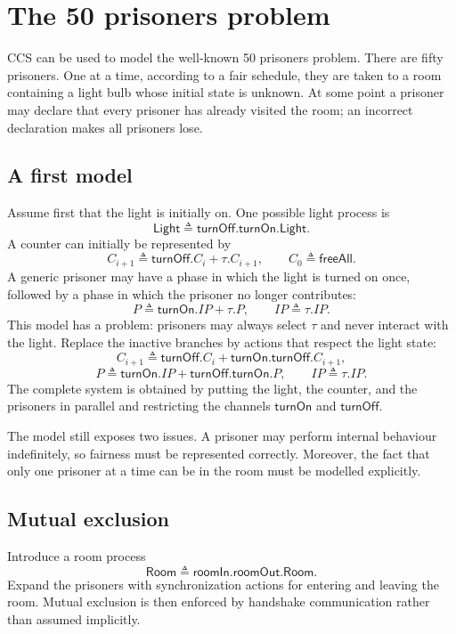 \documentclass[a4paper]{article}
\begin{document}
\section{The 50 prisoners problem}

CCS can be used to model the well-known 50 prisoners problem.
There are fifty prisoners. One at a time, according to a fair schedule, they are taken to a room containing a light bulb whose initial state is unknown.
At some point a prisoner may declare that every prisoner has already visited the room; an incorrect declaration makes all prisoners lose.

\subsection{A first model}

Assume first that the light is initially on.
One possible light process is
\[
    \mathsf{Light}
    \triangleq
    \mathsf{turnOff}.\mathsf{turnOn}.\mathsf{Light}.
\]
A counter can initially be represented by
\[
    C_{i+1}
    \triangleq
    \mathsf{turnOff}.C_i
    +
    \tau.C_{i+1},
    \qquad
    C_0\triangleq\mathsf{freeAll}.
\]
A generic prisoner may have a phase in which the light is turned on once, followed by a phase in which the prisoner no longer contributes:
\[
    P\triangleq\mathsf{turnOn}.IP+\tau.P,
    \qquad
    IP\triangleq\tau.IP.
\]
This model has a problem: prisoners may always select \(\tau\) and never interact with the light.
Replace the inactive branches by actions that respect the light state:
\[
    C_{i+1}
    \triangleq
    \mathsf{turnOff}.C_i
    +
    \mathsf{turnOn}.\mathsf{turnOff}.C_{i+1},
\]
\[
    P
    \triangleq
    \mathsf{turnOn}.IP
    +
    \mathsf{turnOff}.\mathsf{turnOn}.P,
    \qquad
    IP\triangleq\tau.IP.
\]
The complete system is obtained by putting the light, the counter, and the prisoners in parallel and restricting the channels \(\mathsf{turnOn}\) and \(\mathsf{turnOff}\).

The model still exposes two issues.
A prisoner may perform internal behaviour indefinitely, so fairness must be represented correctly.
Moreover, the fact that only one prisoner at a time can be in the room must be modelled explicitly.

\subsection{Mutual exclusion}

Introduce a room process
\[
    \mathsf{Room}
    \triangleq
    \mathsf{roomIn}.\mathsf{roomOut}.\mathsf{Room}.
\]
Expand the prisoners with synchronization actions for entering and leaving the room.
Mutual exclusion is then enforced by handshake communication rather than assumed implicitly.
\end{document}
